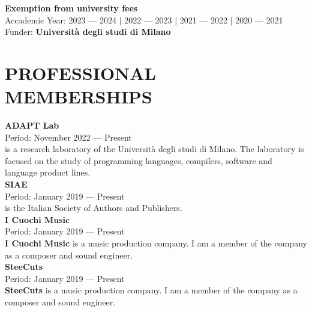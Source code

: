 \documentclass[a4paper,9pt]{extarticle}
\begin{document}
\noindent
\newline
\textbf{Exemption from university fees} \\
Accademic Year: 2023 --- 2024 $|$ 2022 --- 2023 $|$ 2021 --- 2022 $|$ 2020 --- 2021 \\
Funder: \textbf{Universit\`a degli studi di Milano} \\


\section*{PROFESSIONAL MEMBERSHIPS}

\noindent
\newline
\textbf{ADAPT Lab} \\
Period: November 2022 --- Present \\
\adaptlab is a research laboratory of the Universit\`a degli studi di Milano. The laboratory is focused on the study of programming languages, compilers, software and language product lines. \\

\noindent
\textbf{SIAE} \\
Period: January 2019 --- Present \\
\siae is the Italian Society of Authors and Publishers. \\

\noindent
\textbf{I Cuochi Music} \\
Period: January 2019 --- Present \\
\textbf{I Cuochi Music} is a music production company. I am a member of the company as a composer and sound engineer. \\

\noindent
\textbf{SteeCuts} \\
Period: January 2019 --- Present \\
\textbf{SteeCuts} is a music production company. I am a member of the company as a composer and sound engineer. \\


%
%
%
\end{document}
